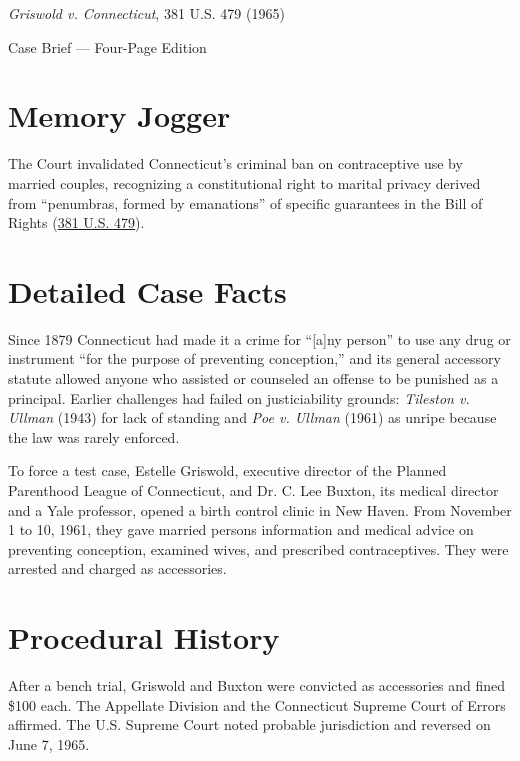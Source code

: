 \documentclass[12pt]{article}
\begin{document}
\begin{center}
{\LARGE \textit{Griswold v. Connecticut}, 381 U.S. 479 (1965)\par}
\vspace{0.8em}
{\large Case Brief --- Four-Page Edition\par}
\end{center}
\vspace{1em}

\section{Memory Jogger}

The Court invalidated Connecticut's criminal ban on contraceptive use by married couples, recognizing a constitutional right to marital privacy derived from ``penumbras, formed by emanations'' of specific guarantees in the Bill of Rights (\href{https://supreme.justia.com/cases/federal/us/381/479/}{381 U.S. 479}).

\section{Detailed Case Facts}

Since 1879 Connecticut had made it a crime for ``[a]ny person'' to use any drug or instrument ``for the purpose of preventing conception,'' and its general accessory statute allowed anyone who assisted or counseled an offense to be punished as a principal. Earlier challenges had failed on justiciability grounds: \textit{Tileston v. Ullman} (1943) for lack of standing and \textit{Poe v. Ullman} (1961) as unripe because the law was rarely enforced.

To force a test case, Estelle Griswold, executive director of the Planned Parenthood League of Connecticut, and Dr. C. Lee Buxton, its medical director and a Yale professor, opened a birth control clinic in New Haven. From November 1 to 10, 1961, they gave married persons information and medical advice on preventing conception, examined wives, and prescribed contraceptives. They were arrested and charged as accessories.

\section{Procedural History}

After a bench trial, Griswold and Buxton were convicted as accessories and fined \$100 each. The Appellate Division and the Connecticut Supreme Court of Errors affirmed. The U.S. Supreme Court noted probable jurisdiction and reversed on June 7, 1965.
\end{document}
